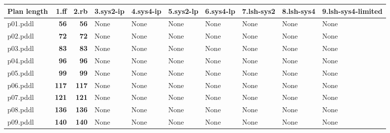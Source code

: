 \documentclass{article}
\begin{document}
\begin{tabular}{@{}lrrrrrrrrr@{}}
Plan length & 1.ff & 2.rb & 3.sys2-ip & 4.sys4-ip & 5.sys2-lp & 6.sys4-lp & 7.lsh-sys2 & 8.lsh-sys4 & 9.lsh-sys4-limited \\
\midrule
p01.pddl & \textbf{56} & \textbf{56} & \multicolumn{1}{|l|}{None} & \multicolumn{1}{|l|}{None} & \multicolumn{1}{|l|}{None} & \multicolumn{1}{|l|}{None} & \multicolumn{1}{|l|}{None} & \multicolumn{1}{|l|}{None} & \multicolumn{1}{|l|}{None} \\
p02.pddl & \textbf{72} & \textbf{72} & \multicolumn{1}{|l|}{None} & \multicolumn{1}{|l|}{None} & \multicolumn{1}{|l|}{None} & \multicolumn{1}{|l|}{None} & \multicolumn{1}{|l|}{None} & \multicolumn{1}{|l|}{None} & \multicolumn{1}{|l|}{None} \\
p03.pddl & \textbf{83} & \textbf{83} & \multicolumn{1}{|l|}{None} & \multicolumn{1}{|l|}{None} & \multicolumn{1}{|l|}{None} & \multicolumn{1}{|l|}{None} & \multicolumn{1}{|l|}{None} & \multicolumn{1}{|l|}{None} & \multicolumn{1}{|l|}{None} \\
p04.pddl & \textbf{96} & \textbf{96} & \multicolumn{1}{|l|}{None} & \multicolumn{1}{|l|}{None} & \multicolumn{1}{|l|}{None} & \multicolumn{1}{|l|}{None} & \multicolumn{1}{|l|}{None} & \multicolumn{1}{|l|}{None} & \multicolumn{1}{|l|}{None} \\
p05.pddl & \textbf{99} & \textbf{99} & \multicolumn{1}{|l|}{None} & \multicolumn{1}{|l|}{None} & \multicolumn{1}{|l|}{None} & \multicolumn{1}{|l|}{None} & \multicolumn{1}{|l|}{None} & \multicolumn{1}{|l|}{None} & \multicolumn{1}{|l|}{None} \\
p06.pddl & \textbf{117} & \textbf{117} & \multicolumn{1}{|l|}{None} & \multicolumn{1}{|l|}{None} & \multicolumn{1}{|l|}{None} & \multicolumn{1}{|l|}{None} & \multicolumn{1}{|l|}{None} & \multicolumn{1}{|l|}{None} & \multicolumn{1}{|l|}{None} \\
p07.pddl & \textbf{121} & \textbf{121} & \multicolumn{1}{|l|}{None} & \multicolumn{1}{|l|}{None} & \multicolumn{1}{|l|}{None} & \multicolumn{1}{|l|}{None} & \multicolumn{1}{|l|}{None} & \multicolumn{1}{|l|}{None} & \multicolumn{1}{|l|}{None} \\
p08.pddl & \textbf{136} & \textbf{136} & \multicolumn{1}{|l|}{None} & \multicolumn{1}{|l|}{None} & \multicolumn{1}{|l|}{None} & \multicolumn{1}{|l|}{None} & \multicolumn{1}{|l|}{None} & \multicolumn{1}{|l|}{None} & \multicolumn{1}{|l|}{None} \\
p09.pddl & \textbf{140} & \textbf{140} & \multicolumn{1}{|l|}{None} & \multicolumn{1}{|l|}{None} & \multicolumn{1}{|l|}{None} & \multicolumn{1}{|l|}{None} & \multicolumn{1}{|l|}{None} & \multicolumn{1}{|l|}{None} & \multicolumn{1}{|l|}{None} \\

\end{tabular}
\end{document}
